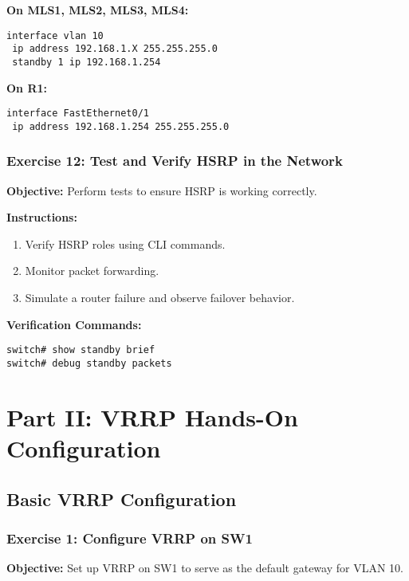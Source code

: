 \documentclass[12pt]{article}
\begin{document}
\textbf{On MLS1, MLS2, MLS3, MLS4:}
\begin{lstlisting}[style=CiscoCLI]
interface vlan 10
 ip address 192.168.1.X 255.255.255.0
 standby 1 ip 192.168.1.254
\end{lstlisting}

\textbf{On R1:}
\begin{lstlisting}[style=CiscoCLI]
interface FastEthernet0/1
 ip address 192.168.1.254 255.255.255.0
\end{lstlisting}

\bigskip

\subsubsection*{Exercise 12: Test and Verify HSRP in the Network}
\textbf{Objective:} Perform tests to ensure HSRP is working correctly.

\textbf{Instructions:}
\begin{enumerate}
\item Verify HSRP roles using CLI commands.
\item Monitor packet forwarding.
\item Simulate a router failure and observe failover behavior.
\end{enumerate}

\textbf{Verification Commands:}
\begin{lstlisting}[style=CiscoCLI]
switch# show standby brief
switch# debug standby packets
\end{lstlisting}

\newpage


\section{Part II: VRRP Hands-On Configuration}

\subsection{Basic VRRP Configuration}

\subsubsection*{Exercise 1: Configure VRRP on SW1}
\textbf{Objective:} Set up VRRP on SW1 to serve as the default gateway for VLAN 10.
\end{document}
